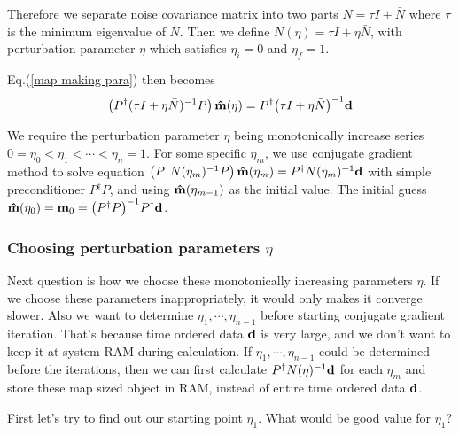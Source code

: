 \documentclass[11pt, letterpaper]{article}
\newcommand{\vbd}{\vb{d}}
\newcommand{\vbm}{\vb{m}}
\newcommand{\inv}[1]{#1^{-1}}
\newcommand{\hatm}{\vb{\hat{m}}}
\newcommand{\Pdagger}{P^{\dagger}}
\newcommand{\Nbar}{\bar{N}}
\newcommand{\PPinv}[1]{\inv{\qty(\Pdagger #1 P)}}
\begin{document}
Therefore we separate noise covariance matrix into two parts
$N = \tau I + \Nbar$ where $\tau$ is the minimum eigenvalue of $N$. 
Then we define $N(\eta) = \tau I + \eta \Nbar$, 
with perturbation parameter $\eta$ which satisfies $\eta_i = 0$ and $\eta_f=1$.

Eq.(\ref{map making para}) then becomes
\begin{align}
\qty(\Pdagger \inv{(\tau I + \eta \Nbar)}P) \, \hatm(\eta) 
= \Pdagger \inv{\qty(\tau I + \eta \Nbar)} \vbd \label{map making perturb} 
\end{align}

We require the perturbation parameter $\eta$ being monotonically increase
series $0 = \eta_0 < \eta_1 < \cdots < \eta_n = 1$.
For some specific $\eta_m$, we use conjugate gradient method to solve equation 
$\qty(\Pdagger \inv{N(\eta_m)} P)\, 
\hatm(\eta_m) = \Pdagger \inv{N(\eta_m)} \vbd$
with simple preconditioner $\Pdagger P$,
and using $\hatm(\eta_{m-1})$ as the initial value.
The initial guess $\hatm(\eta_0) = \vbm_0 = \PPinv{} \Pdagger \vbd$.


\subsubsection{Choosing perturbation parameters $\eta$}
Next question is how we choose these monotonically increasing parameters
$\eta$. 
If we choose these parameters inappropriately, it would only makes it converge
slower.
Also we want to determine $\eta_1, \cdots, \eta_{n-1}$ before starting conjugate
gradient iteration.
That's because time ordered data $\vbd$ is very large,
and we don't want to keep it at system RAM during calculation.
If $\eta_1, \cdots, \eta_{n-1}$ could be determined before the iterations, 
then we can first calculate $\Pdagger \inv{N(\eta)} \vbd$ for each $\eta_m$
and store these map sized object in RAM,
instead of entire time ordered data $\vbd$.

First let's try to find out our starting point $\eta_1$.
What would be good value for $\eta_1$?
\end{document}
